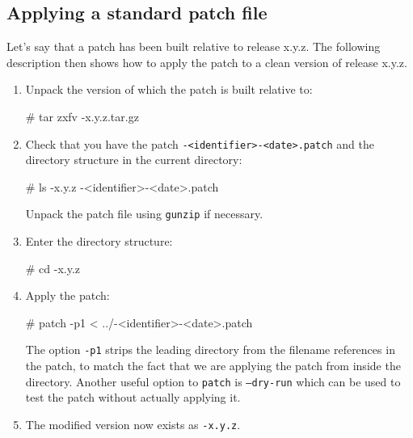 \subsection{Applying a standard patch file}

Let's say that a patch has been built relative to \package{} release x.y.z.
The following description then shows how to apply the patch to a clean
version of release x.y.z.

\begin{enumerate}
\item
  Unpack the version of \package{} which the patch is built relative to:
  \begin{macrocode}
# tar zxfv \packagett{}-x.y.z.tar.gz
  \end{macrocode}
\item
  Check that you have the patch \texttt{\packagett{}-<identifier>-<date>.patch} and the \package{}
  directory structure in the current directory:
  \begin{macrocode}
# ls
\packagett{}-x.y.z
\packagett{}-<identifier>-<date>.patch
  \end{macrocode}
  Unpack the patch file using \texttt{gunzip} if necessary.
\item
  Enter the \package{} directory structure:
  \begin{macrocode}
# cd \packagett{}-x.y.z
  \end{macrocode}
\item
  Apply the patch:
  \begin{macrocode}
# patch -p1 < ../\packagett{}-<identifier>-<date>.patch
  \end{macrocode}
  The option \texttt{-p1} strips the leading directory from the filename
  references in the patch, to match the fact that we are applying the
  patch from inside the directory. Another useful option to
  \texttt{patch} is \texttt{--dry-run} which can be used to test the
  patch without actually applying it.
\item
  The modified version now exists as \texttt{\packagett{}-x.y.z}.
\end{enumerate}
